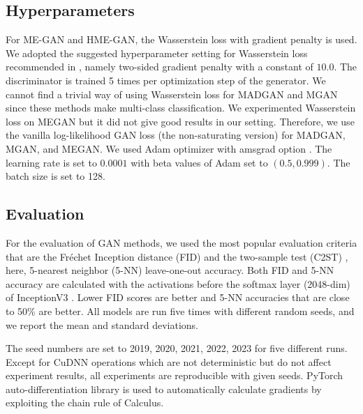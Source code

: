 \documentclass[a4paper,onesided,12pt]{report}
\begin{document}
\subsection{Hyperparameters}
\label{subsec:hyperparameter}
For ME-GAN and HME-GAN, the Wasserstein loss \cite{arjovsky2017wasserstein} with gradient penalty \cite{gulrajani2017improved} is used. We adopted the suggested hyperparameter setting for Wasserstein loss recommended in \cite{gulrajani2017improved}, namely two-sided gradient penalty with a constant of $10.0$. The discriminator is trained 5 times per optimization step of the generator. We cannot find a trivial way of using Wasserstein loss for MADGAN and MGAN since these methods make multi-class classification. We experimented Wasserstein loss on MEGAN but it did not give good results in our setting. Therefore, we use the vanilla log-likelihood GAN loss (the non-saturating version) for MADGAN, MGAN, and MEGAN. We used Adam optimizer \cite{kingma2014adam} with amsgrad option \cite{reddi2019convergence}. The learning rate is set to $0.0001$ with beta values of Adam set to $(0.5, 0.999)$. The batch size is set to 128.

\subsection{Evaluation}
\label{subsec:eval}
For the evaluation of GAN methods, we used the most popular evaluation criteria that are the Fr\'echet Inception distance (FID) \cite{heusel2017gans} and the two-sample test (C2ST) \cite{lopez2016revisiting}, here, 5-nearest neighbor (5-NN) leave-one-out accuracy. Both FID and 5-NN accuracy are calculated with the activations before the softmax layer (2048-dim) of InceptionV3 \cite{szegedy2016rethinking}. Lower FID scores are better and 5-NN accuracies that are close to 50\% are better. All models are run five times with different random seeds, and we report the mean and standard deviations.

The seed numbers are set to {2019, 2020, 2021, 2022, 2023} for five different runs. Except for CuDNN \cite{chetlur2014cudnn} operations which are not deterministic but do not affect experiment results, all experiments are reproducible with given seeds. PyTorch auto-differentiation library \cite{paszke2017automatic} is used to automatically calculate gradients by exploiting the chain rule of Calculus.
\end{document}
